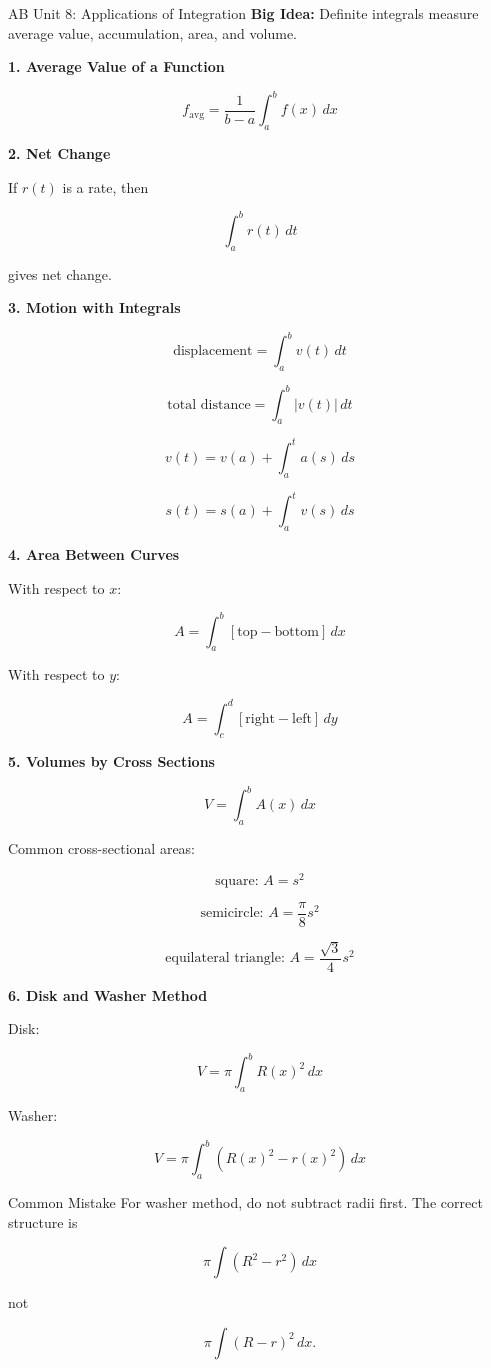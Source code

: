 \documentclass[11pt]{article}
\newcommand{\subtopic}[1]{
\vspace{0.45em}
\textcolor{novelPurpleDark}{\textbf{#1}}
}
\begin{document}
\newpage

\begin{unitbox}{AB Unit 8: Applications of Integration}
\textbf{Big Idea:} Definite integrals measure average value, accumulation, area, and volume.
\end{unitbox}

\subtopic{1. Average Value of a Function}

\[
f_{\text{avg}}=\frac{1}{b-a}\int_a^b f(x)\,dx
\]

\subtopic{2. Net Change}

If \(r(t)\) is a rate, then

\[
\int_a^b r(t)\,dt
\]

gives net change.

\subtopic{3. Motion with Integrals}

\[
\text{displacement}=\int_a^b v(t)\,dt
\]

\[
\text{total distance}=\int_a^b |v(t)|\,dt
\]

\[
v(t)=v(a)+\int_a^t a(s)\,ds
\]

\[
s(t)=s(a)+\int_a^t v(s)\,ds
\]

\subtopic{4. Area Between Curves}

With respect to \(x\):

\[
A=\int_a^b [\text{top}-\text{bottom}]\,dx
\]

With respect to \(y\):

\[
A=\int_c^d [\text{right}-\text{left}]\,dy
\]

\subtopic{5. Volumes by Cross Sections}

\[
V=\int_a^b A(x)\,dx
\]

Common cross-sectional areas:

\[
\text{square: }A=s^2
\]

\[
\text{semicircle: }A=\frac{\pi}{8}s^2
\]

\[
\text{equilateral triangle: }A=\frac{\sqrt3}{4}s^2
\]

\subtopic{6. Disk and Washer Method}

Disk:

\[
V=\pi\int_a^b R(x)^2\,dx
\]

Washer:

\[
V=\pi\int_a^b \left(R(x)^2-r(x)^2\right)\,dx
\]

\begin{warningbox}{Common Mistake}
For washer method, do not subtract radii first.  
The correct structure is

\[
\pi\int (R^2-r^2)\,dx
\]

not

\[
\pi\int (R-r)^2\,dx.
\]
\end{warningbox}
\end{document}
